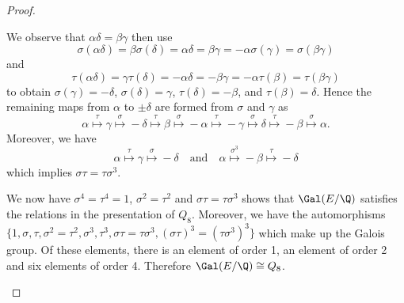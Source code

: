 \documentclass[10pt]{amsart}
\begin{document}
\begin{thm}
\begin{proof}
\begin{alphaenum}
      We observe that $\alpha\delta = \beta\gamma$ then use
      $$\sigma(\alpha\delta) =  \beta\sigma(\delta) = \alpha\delta =  \beta\gamma =  -\alpha\sigma(\gamma) = \sigma(\beta\gamma)$$ 
      and 
      $$\tau(\alpha\delta) = \gamma\tau(\delta) = -\alpha\delta = -\beta\gamma = -\alpha\tau(\beta) = \tau(\beta\gamma)$$ to obtain $\sigma(\gamma) = -\delta$, $\sigma(\delta) = \gamma$, $\tau(\delta) = -\beta$,  and $\tau(\beta) = \delta$.
      Hence the remaining maps from $\alpha$ to $\pm\delta$ are formed from $\sigma$ and $\gamma$ as
      $$\alpha \overset{\tau}{\longmapsto} \gamma \overset{\sigma}{\longmapsto} - \delta \overset{\tau}{\longmapsto} \beta \overset{\sigma}{\longmapsto} - \alpha \overset{\tau}{\longmapsto} -\gamma \overset{\sigma}{\longmapsto} \delta \overset{\tau}{\longmapsto} -\beta \overset{\sigma}{\longmapsto} \alpha.$$
      Moreover, we have 
      $$\alpha \overset{\tau}{\longmapsto} \gamma \overset{\sigma}{\longmapsto} - \delta \quad \text{and} \quad \alpha \overset{\sigma^3}{\longmapsto} -\beta \overset{\tau}{\longmapsto} -\delta$$
      which implies $\sigma\tau = \tau\sigma^3$.
    \item
      We now have $\sigma^4 = \tau^4 = 1$, $\sigma^2 = \tau^2$ and $\sigma\tau = \tau\sigma^3$ shows that $\Gal(E/\Q)$ satisfies the relations in the presentation of $Q_8$.
      Moreover, we have the automorphisms $\{1, \sigma, \tau, \sigma^2 = \tau^2, \sigma^3, \tau^3, \sigma\tau = \tau\sigma^3, (\sigma\tau)^3 = (\tau\sigma^3)^3\}$ which make up the Galois group.
      Of these elements, there is an element of order 1, an element of order 2 and six elements of order 4.
      Therefore $\Gal(E/\Q) \cong Q_8$.
    \end{alphaenum}
  \end{proof}
\end{thm}
\end{document}
